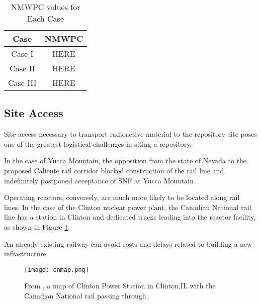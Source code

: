 \begin{table}[h]
	
	\centering
	\caption {\gls{NMWPC} values for Each Case}

		\begin{tabular}{|c|c|}
			\hline
			Case & NMWPC \\
			\hline
			Case I & HERE\\
			Case II & HERE\\
			Case III & HERE\\
			\hline
                \end{tabular}
\end{table}


\subsection{Site Access}



Site access necessary to transport radioactive material to the repository site 
poses one of the greatest logistical challenges in siting a repository. 

In the case of Yucca Mountain, 
the opposition from the state of Nevada to the proposed Caliente rail corridor 
blocked construction of the rail line and indefinitely postponed
acceptance of \gls{SNF} at Yucca Mountain \cite{halstead_yucca_2011}.

Operating reactors, conversely, are much more likely to be located along rail 
lines. In the case of the Clinton nuclear power plant, 
the Canadian National rail line \cite{waleed_regional_2015} has a station in 
Clinton and dedicated tracks leading into the reactor facility, as shown in 
Figure \ref{fig:cnmap}.

An already existing railway can avoid costs and delays related to building a 
new infrastructure.

\begin{figure}[!h] 
  \centering
  \texttt{[image: cnmap.png]}	
        \caption{From \cite{canadian_national_railway_company_canadian_2016}, a map of Clinton Power Station in Clinton,IL
        with the Canadian National rail passing through.}
  \label{fig:cnmap}
\end{figure}

